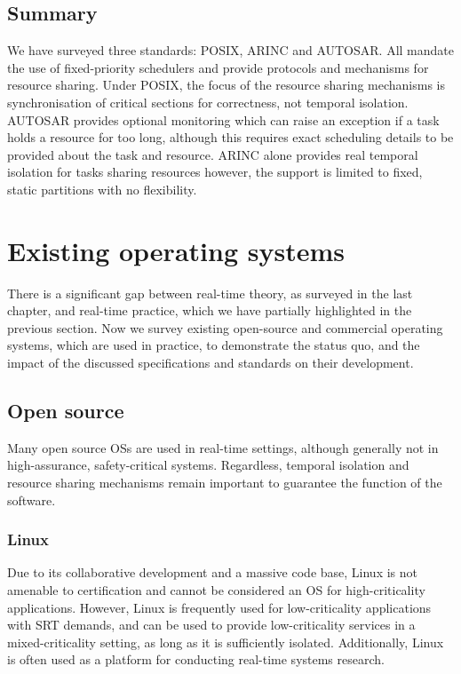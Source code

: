 \subsection{Summary}

We have surveyed three standards: POSIX, ARINC and AUTOSAR. All mandate the use of fixed-priority schedulers 
and provide protocols and mechanisms for resource sharing. Under POSIX, 
the focus of the resource sharing mechanisms is synchronisation of critical sections for
correctness, not temporal isolation. AUTOSAR provides optional monitoring which can raise an
exception if a task holds a resource for too long, although this requires exact scheduling
details to be provided about the task and resource. ARINC alone provides real temporal isolation for
tasks sharing resources however, the support is limited to fixed, static
partitions with no flexibility.

\section{Existing operating systems}

There is a significant gap between real-time theory, as surveyed in the last chapter, and real-time
practice, which we have partially highlighted in the previous section. Now we survey existing open-source
and commercial operating systems, which are used in practice, to demonstrate the status quo, and 
the impact of the discussed specifications and standards on their development.

\subsection{Open source}

Many open source \glspl{OS} are used in real-time settings, although generally not in
high-assurance, safety-critical systems. Regardless, temporal isolation and resource sharing mechanisms remain important to
guarantee the function of the software.

\subsubsection{Linux}

Due to its collaborative development and a massive code base, Linux is not amenable to
certification and cannot be considered an \gls{OS} for high-criticality applications. However, Linux
is frequently used for low-criticality applications with \gls{SRT} demands, and can be used to
provide low-criticality services in a mixed-criticality setting, as long as it is sufficiently
isolated. Additionally, Linux is often used as a platform for conducting real-time systems research. 

